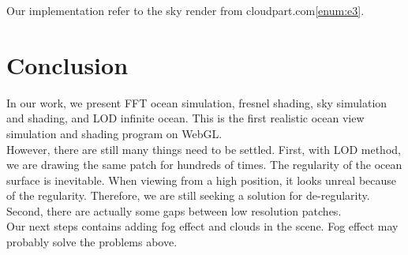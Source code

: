 \documentclass{jcgt}
\begin{document}
Our implementation refer to the sky render from cloudpart.com\ref{enum:e3}. 

\section{Conclusion}
In our work, we present FFT ocean simulation, fresnel shading, sky simulation and shading, and LOD infinite ocean. This is the first realistic ocean view simulation and shading program on WebGL. \\

However, there are still many things need to be settled. First, with LOD method, we are drawing the same patch for hundreds of times. The regularity of the ocean surface is inevitable. When viewing from a high position, it looks unreal because of the regularity. Therefore, we are still seeking a solution for de-regularity. Second, there are actually some gaps between low resolution patches.\\

Our next steps contains adding fog effect and clouds in the scene. Fog effect may probably solve the problems above.





\small


\end{document}
